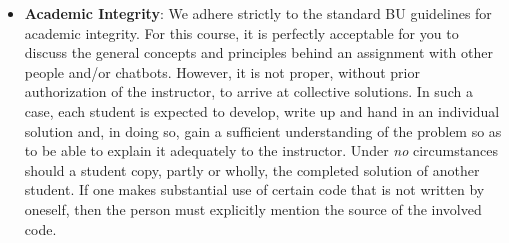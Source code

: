 \documentclass[11pt]{article}
\begin{document}
\begin{itemize}
\item{\bf Academic Integrity}:
We adhere strictly to the standard BU guidelines for academic
integrity. For this course, it is perfectly acceptable for you to
discuss the general concepts and principles behind an assignment with
other people and/or chatbots. However, it is not proper, without prior
authorization of the instructor, to arrive at collective solutions. In
such a case, each student is expected to develop, write up and hand in
an individual solution and, in doing so, gain a sufficient
understanding of the problem so as to be able to explain it adequately
to the instructor.  Under {\em no} circumstances should a student
copy, partly or wholly, the completed solution of another student. If
one makes substantial use of certain code that is not written by
oneself, then the person must explicitly mention the source of the
involved code.

\end{itemize}
\end{document}
